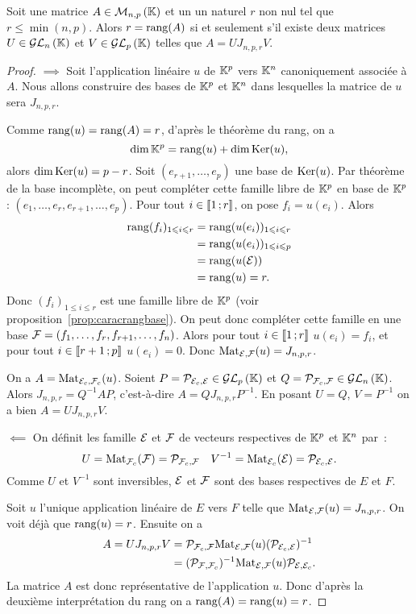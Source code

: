 \begin{theo}
  Soit une matrice $A \in \mathcal{M}_{n,p}\left(\mathbb{K}\right)$ et un un naturel $r$ non nul tel que $r \leqslant \min(n,p)$. Alors $r=\operatorname{rang}(A)$ si et seulement s'il existe deux matrices $U \in \mathcal{GL}_{n}\left(\mathbb{K}\right)$ et $V \in \mathcal{GL}_{p}\left(\mathbb{K}\right)$ telles que $A=UJ_{n,p,r}V$.
\end{theo}
\begin{proof}
  $\implies$ Soit l'application linéaire $u$ de $\mathbb{K}^p$ vers $\mathbb{K}^n$ canoniquement associée à $A$. Nous allons construire des bases de $\mathbb{K}^p$ et $\mathbb{K}^n$ dans lesquelles la matrice de $u$ sera $J_{n,p,r}$. 
  
  Comme $\operatorname{rang}(u)=\operatorname{rang}(A)=r$, d'après le théorème du rang, on a
  \begin{equation}
    \dim \mathbb{K}^p = \operatorname{rang}(u)+\dim \operatorname{Ker}(u),
  \end{equation}
  alors $\dim \operatorname{Ker}(u) = p-r$. Soit $(e_{r+1}, \ldots, e_p)$ une base de $\operatorname{Ker}(u)$. Par théorème de la base incomplète, on peut compléter cette famille libre de $\mathbb{K}^p$ en base de $\mathbb{K}^p$ : $(e_1, \ldots, e_r, e_{r+1}, \ldots, e_p)$. Pour tout $i \in \mathopen{\llbracket}1\mathclose{}\mathpunct{};r\mathclose{\rrbracket}$, on pose $f_i = u(e_i)$. Alors
  \begin{align}
    \operatorname{rang}(f_i)_{1 \leqslant i \leqslant r} &= \operatorname{rang}(u(e_i))_{1 \leqslant i \leqslant r}\\
    &= \operatorname{rang}(u(e_i))_{1 \leqslant i \leqslant p}\\
    &= \operatorname{rang}(u(\mathcal{E}))\\
    &=\operatorname{rang}(u)=r.
  \end{align}
  Donc $(f_i)_{1\leqslant i\leqslant r}$ est une famille libre de $\mathbb{K}^p$ (voir proposition~\ref{prop:caracrangbase}). On peut donc compléter cette famille en une base $\mathcal{F}=(f_1, \ldots, f_r,f_{r+1}, \ldots, f_n)$. Alors pour tout $i \in \mathopen{\llbracket}1\mathclose{}\mathpunct{};r\mathclose{\rrbracket}$ $u(e_i)=f_i$, et pour tout $i \in \mathopen{\llbracket}r+1\mathclose{}\mathpunct{};p\mathclose{\rrbracket}$ $u(e_i)=0$. Donc $\mathrm{Mat}_{\mathcal{E},\mathcal{F}}(u) = J_{n,p,r}$.

  On a $A=\mathrm{Mat}_{\mathcal{E}_c,\mathcal{F}_c}(u)$. Soient $P=\mathcal{P}_{\mathcal{E}_c,\mathcal{E}} \in \mathcal{GL}_{p}\left(\mathbb{K}\right)$ et $Q=\mathcal{P}_{\mathcal{F}_c,\mathcal{F}} \in \mathcal{GL}_{n}\left(\mathbb{K}\right)$. Alors $J_{n,p,r}=Q^{-1}AP$, c'est-à-dire $A=QJ_{n,p,r}P^{-1}$. En posant $U=Q$, $V=P^{-1}$ on a bien $A=U J_{n,p,r} V$.
  
  $\impliedby$  On définit les famille $\mathcal{E}$ et $\mathcal{F}$ de vecteurs respectives de $\mathbb{K}^p$ et $\mathbb{K}^n$ par~:
  \begin{equation}
    U=\mathrm{Mat}_{\mathcal{F}_c}(\mathcal{F})=\mathcal{P}_{\mathcal{F}_c,\mathcal{F}} \quad V^{-1}=\mathrm{Mat}_{\mathcal{E}_c}(\mathcal{E})=\mathcal{P}_{\mathcal{E}_c,\mathcal{E}}.
  \end{equation}
  Comme $U$ et $V^{-1}$ sont inversibles, $\mathcal{E}$ et $\mathcal{F}$ sont des bases respectives de $E$ et $F$. 

  Soit $u$ l'unique application linéaire de $E$ vers $F$ telle que $\mathrm{Mat}_{\mathcal{E},\mathcal{F}}(u)=J_{n,p,r}$. On voit déjà que $\operatorname{rang}(u)=r$. Ensuite on a
  \begin{align}
    A = U J_{n,p,r} V &= \mathcal{P}_{\mathcal{F}_c,\mathcal{F}} \mathrm{Mat}_{\mathcal{E},\mathcal{F}}(u) (\mathcal{P}_{\mathcal{E}_c,\mathcal{E}})^{-1} \\
    &=(\mathcal{P}_{\mathcal{F},\mathcal{F}_c})^{-1} \mathrm{Mat}_{\mathcal{E},\mathcal{F}}(u) \mathcal{P}_{\mathcal{E},\mathcal{E}_c}.
  \end{align}
  La matrice $A$ est donc représentative de l'application $u$. Donc d'après la deuxième interprétation du rang on a $\operatorname{rang}(A)=\operatorname{rang}(u)=r$.
\end{proof}

